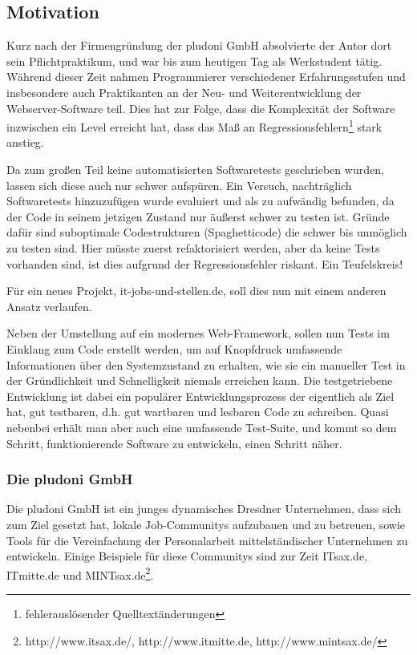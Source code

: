 \subsection{Motivation}

Kurz nach der Firmengründung der pludoni GmbH absolvierte der Autor dort sein Pflichtpraktikum, und war bis zum heutigen Tag als Werkstudent tätig.
Während dieser Zeit nahmen Programmierer verschiedener Erfahrungsstufen und insbesondere auch Praktikanten an der Neu- und Weiterentwicklung der Webserver-Software teil. Dies hat zur Folge, dass die Komplexität der Software inzwischen ein Level erreicht hat, dass das Maß an Regressionsfehlern\footnote{fehlerauslösender Quelltextänderungen} stark anstieg. 

Da zum großen Teil keine automatisierten Softwaretests geschrieben wurden, lassen sich diese auch nur schwer aufspüren. Ein Versuch, nachträglich Softwaretests hinzuzufügen wurde evaluiert und als zu aufwändig befunden, da der Code in seinem jetzigen Zustand nur äußerst schwer zu testen ist. Gründe dafür sind suboptimale Codestrukturen (Spaghetticode) die schwer bis unmöglich zu testen sind. Hier müsste zuerst refaktorisiert werden, aber da keine Tests vorhanden sind, ist dies aufgrund der Regressionsfehler riskant. Ein Teufelskreis!

Für ein neues Projekt, it-jobs-und-stellen.de, soll dies nun mit einem anderen Ansatz verlaufen. 

Neben der Umstellung auf ein modernes Web-Framework, sollen nun Tests im Einklang zum Code erstellt werden, um auf Knopfdruck  umfassende Informationen über den Systemzustand zu erhalten, wie sie ein manueller Test in der Gründlichkeit und Schnelligkeit niemals erreichen kann. Die testgetriebene Entwicklung ist dabei ein populärer Entwicklungsprozess der eigentlich als Ziel hat, gut testbaren, d.h. gut wartbaren und lesbaren Code zu schreiben. Quasi nebenbei erhält man aber auch eine umfassende Test-Suite, und kommt so dem Schritt, funktionierende Software zu entwickeln, einen Schritt näher.

\subsubsection{Die pludoni GmbH}

Die pludoni GmbH ist ein junges dynamisches Dresdner Unternehmen, dass sich zum Ziel gesetzt hat, lokale Job-Communitys aufzubauen und zu betreuen, sowie Tools für die Vereinfachung der Personalarbeit mittelständischer Unternehmen zu entwickeln. Einige Beispiele für diese Communitys sind zur Zeit ITsax.de, ITmitte.de und MINTsax.de\footnote{http://www.itsax.de/, http://www.itmitte.de, http://www.mintsax.de/}.
